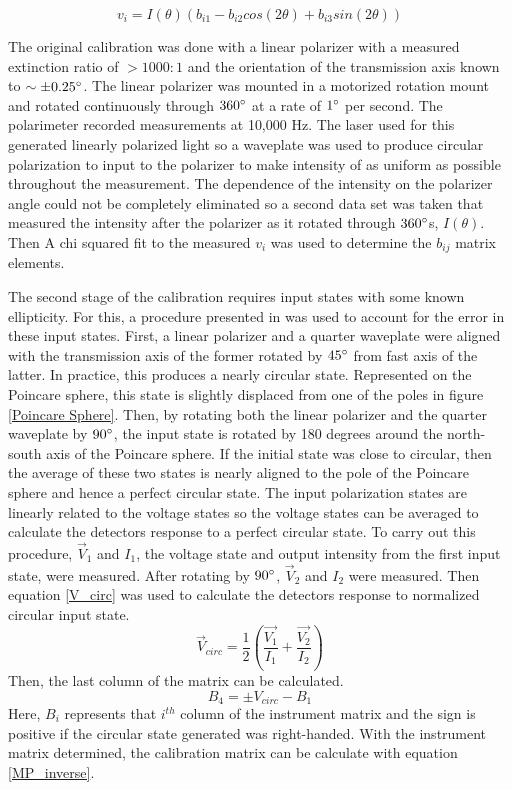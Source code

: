 \documentclass{article}
\begin{document}
\begin{equation}
    v_i = I(\theta) \left( b_{i1} - b_{i2}cos(2\theta) + b_{i3}sin(2\theta) \right)
\end{equation}

The original calibration was done with a linear polarizer with a measured extinction ratio of $>1000:1$ and the orientation of the transmission axis known to $\sim\pm0.25\degree$. The linear polarizer was mounted in a motorized rotation mount and rotated continuously through $360\degree$ at a rate of $1\degree$ per second. The polarimeter recorded measurements at 10,000 Hz. The laser used for this generated linearly polarized light so a waveplate was used to produce circular polarization to input to the polarizer to make intensity of as uniform as possible throughout the measurement. The dependence of the intensity on the polarizer angle could not be completely eliminated so a second data set was taken that measured the intensity after the polarizer as it rotated through $360\degree$s, $I(\theta)$. Then  A chi squared fit to the measured $v_{i}$ was used to determine the $b_{ij}$ matrix elements.

 The second stage of the calibration requires input states with some known ellipticity. For this, a procedure presented in \cite{Azzam89} was used to account for the error in these input states. First, a linear polarizer and a quarter waveplate were aligned with the transmission axis of the former rotated by $45\degree$ from fast axis of the latter. In practice, this produces a nearly circular state. Represented on the Poincare sphere, this state is slightly displaced from one of the poles in figure \ref{Poincare Sphere}. Then, by rotating both the linear polarizer and the quarter waveplate by $90\degree$, the input state is rotated by 180 degrees around the north-south axis of the Poincare sphere. If the initial state was close to circular, then the average of these two states is nearly aligned to the pole of the Poincare sphere and hence a perfect circular state. The input polarization states are linearly related to the voltage states so the voltage states can be averaged to calculate the detectors response to a perfect circular state. To carry out this procedure, $\Vec{V}_1$ and $I_1$, the voltage state and output intensity from the first input state, were measured. After rotating by $90\degree$, $\Vec{V}_2$ and $I_2$ were measured. Then equation \ref{V_circ} was used to calculate the detectors response to normalized circular input state. 
 \begin{equation}
     \Vec{V}_{circ} = \frac{1}{2} \left( \dfrac{\Vec{V_1}}{I_1} + \dfrac{\Vec{V_2}}{I_2} \right)
     \label{V_circ}
 \end{equation}
Then, the last column of the matrix can be calculated.
\begin{equation}
    B_4 = \pm V_{circ} - B_1
    \label{last_col}
\end{equation}
Here, $B_i$ represents that $i^{th}$ column of the instrument matrix and the sign is positive if the circular state generated was right-handed. With the instrument matrix determined, the calibration matrix can be calculate with equation \ref{MP_inverse}. 
\end{document}
